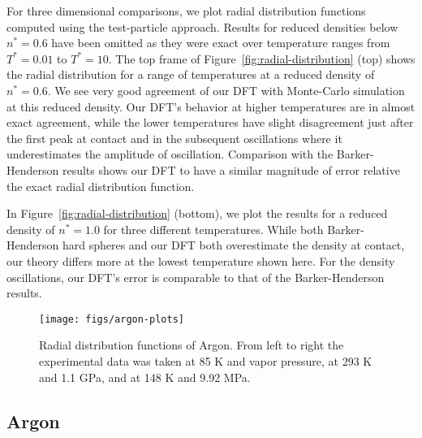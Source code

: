 \documentclass[letterpaper,twocolumn,amsmath,amssymb,prb]{revtex4-1}
\begin{document}
For three dimensional comparisons, we plot radial distribution
functions computed using the test-particle approach.  Results for
reduced densities below $n^* = 0.6$ have been
omitted as they were exact over temperature ranges from $T^*=0.01$ to
$T^*=10$. The top frame of Figure~\ref{fig:radial-distribution} (top) shows
the radial distribution for a range of temperatures at a reduced
density of $n^* = 0.6$. We see very good agreement of our DFT with
Monte-Carlo simulation at this reduced density. Our DFT's behavior at
higher temperatures are in almost exact agreement, while the lower
temperatures have slight disagreement just after the first peak at
contact and in the subsequent oscillations where it underestimates the
amplitude of oscillation. Comparison with the Barker-Henderson results
shows our DFT to have a similar magnitude of error relative the exact
radial distribution function.

In Figure~\ref{fig:radial-distribution} (bottom), we plot the results
for a reduced density of $n^*=1.0$ for three different
temperatures. While both Barker-Henderson hard spheres and our DFT
both overestimate the density at contact, our theory differs more at
the lowest temperature shown here. For the density oscillations, our
DFT's error is comparable to that of the Barker-Henderson results.
\newline

\begin{figure*}
  \begin{center}
    \texttt{[image: figs/argon-plots]}
  \end{center}
  \caption{Radial distribution functions of Argon. From left to right
    the experimental data was taken at 85 K and vapor pressure, at 293
    K and 1.1 GPa, and at 148 K and 9.92 MPa.}
  \label{fig:argon-plots}
\end{figure*}


\subsection{Argon}
\end{document}
